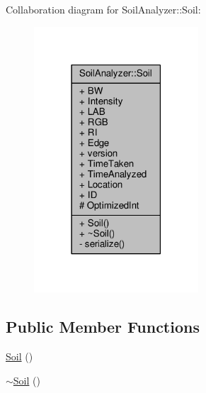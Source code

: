 Collaboration diagram for Soil\+Analyzer\+:\+:Soil\+:\nopagebreak
\begin{figure}[H]
\begin{center}
\leavevmode
\includegraphics[width=174pt]{class_soil_analyzer_1_1_soil__coll__graph}
\end{center}
\end{figure}
\subsection*{Public Member Functions}
\begin{DoxyCompactItemize}
\item 
\hyperlink{class_soil_analyzer_1_1_soil_aee6934dca3d712e86648f92d60e78765}{Soil} ()
\item 
\hyperlink{class_soil_analyzer_1_1_soil_aceb78f5d1984d93604f20ad3bc5bef30}{$\sim$\+Soil} ()
\end{DoxyCompactItemize}
